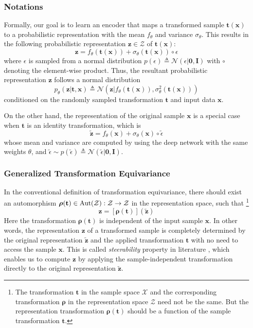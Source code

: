 \documentclass[10pt,journal,compsoc,twoside]{IEEEtran}
\begin{document}
\subsubsection{Notations}
Formally, our goal is to learn an encoder that maps a transformed sample $\mathbf t(\mathbf x)$ to a probabilistic representation with the mean $f_\theta$ and variance $\sigma_\theta$. This results in the following probabilistic representation $\mathbf z \in \mathcal Z$ of $\mathbf t(\mathbf x)$:
\begin{equation}\label{eq:rep_t}
\mathbf z = f_\theta(\mathbf t(\mathbf x))+\sigma_\theta(\mathbf t(\mathbf x)) \circ \epsilon
\end{equation}
where $\epsilon$ is sampled from a normal distribution $p(\epsilon)\triangleq\mathcal N(\epsilon|\mathbf 0, \mathbf I)$ with $\circ$ denoting the element-wise product. Thus, the resultant probabilistic representation $\mathbf z$ follows a normal distribution
$$
p_\theta(\mathbf z|\mathbf t, \mathbf x)\triangleq \mathcal N\left(\mathbf z|f_\theta(\mathbf t(\mathbf x)),\sigma_\theta^2(\mathbf t(\mathbf x))\right)
$$
conditioned on the randomly sampled transformation $\mathbf t$ and input data $\mathbf x$.

On the other hand, the representation of the original sample $\mathbf x$ is a special case when $\mathbf t$ is an identity transformation, which is
\begin{equation}\label{eq:rep_ori}
\mathbf {\tilde z} = f_\theta(\mathbf x)+\sigma_\theta(\mathbf x) \circ \tilde \epsilon
\end{equation}
whose mean and variance are computed by using the deep network with the same weights $\theta$, and $\tilde \epsilon \sim p(\tilde\epsilon)\triangleq\mathcal N(\tilde\epsilon|\mathbf 0, \mathbf I)$.

\subsubsection{Generalized Transformation Equivariance}
In the conventional definition of transformation equivariance, there should exist an automorphism $\boldsymbol\rho(\mathbf t)\in {\rm Aut}(\mathcal Z):\mathcal Z \rightarrow \mathcal Z$ in the representation space, such that \footnote{The transformation $\mathbf t$ in the sample space $\mathcal X$ and the corresponding transformation $\boldsymbol\rho$ in the representation space $\mathcal Z$ need not be the same. But the representation transformation $\boldsymbol\rho(\mathbf t)$ should be a function of the sample transformation $\mathbf t$. }
$$
\mathbf z = [\boldsymbol\rho (\mathbf t)](\mathbf {\tilde z})
$$
Here the transformation $\boldsymbol\rho(\mathbf t)$ is independent of the input sample $\mathbf x$. In other words, the representation $\mathbf z$ of a transformed sample is completely determined by the original representation $\mathbf {\tilde z}$ and the applied transformation $\mathbf t$ with no need to access the sample $\mathbf x$. This is called {\em steerability} property in literature \cite{cohen2016steerable}, which enables us to compute  $\mathbf z$ by applying the sample-independent transformation directly to the original representation $\mathbf {\tilde z}$.
\end{document}
